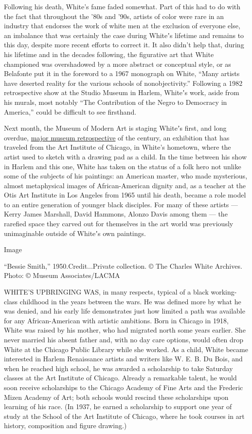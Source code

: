 Following his death, White's fame faded somewhat. Part of this had to do
with the fact that throughout the '80s and '90s, artists of color were
rare in an industry that endorses the work of white men at the exclusion
of everyone else, an imbalance that was certainly the case during
Whiteʼs lifetime and remains to this day, despite more recent efforts to
correct it. It also didn't help that, during his lifetime and in the
decades following, the figurative art that White championed was
overshadowed by a more abstract or conceptual style, or as Belafonte put
it in the foreword to a 1967 monograph on White, ``Many artists have
deserted reality for the various schools of nonobjectivity.'' Following
a 1982 retrospective show at the Studio Museum in Harlem, Whiteʼs work,
aside from his murals, most notably ``The Contribution of the Negro to
Democracy in America,'' could be difficult to see firsthand.

Next month, the Museum of Modern Art is staging Whiteʼs first, and long
overdue, \href{https://www.moma.org/calendar/exhibitions/3930}{major
museum retrospective} of the century, an exhibition that has traveled
from the Art Institute of Chicago, in White's hometown, where the artist
used to sketch with a drawing pad as a child. In the time between his
show in Harlem and this one, White has taken on the status of a folk
hero not unlike some of the subjects of his paintings: an American
master, who made mysterious, almost metaphysical images of
African-American dignity and, as a teacher at the Otis Art Institute in
Los Angeles from 1965 until his death, became a role model to an entire
generation of younger black disciples. For many of these artists ---
Kerry James Marshall, David Hammons, Alonzo Davis among them --- the
rarefied space they carved out for themselves in the art world was
previously unimaginable outside of Whiteʼs own paintings.

Image

``Bessie Smith,'' 1950.Credit...Private collection. © The Charles White
Archives. Photo: © Museum Associates/LACMA

WHITE'S UPBRINGING WAS, in many respects, typical of a black
working-class childhood in the years between the wars. He was defined
more by what he was denied, and his early life demonstrates just how
limited a path was available for any African-American with artistic
ambitions. Born in Chicago in 1918, White was raised by his mother, who
had migrated north some years earlier. She never married his absent
father and, with no day care options, would often drop White at the
Chicago Public Library while she worked. As a child, White became
interested in Harlem Renaissance artists and writers like W. E. B. Du
Bois, and when he reached high school, he was awarded a scholarship to
take Saturday classes at the Art Institute of Chicago. Already a
remarkable talent, he would soon receive scholarships to the Chicago
Academy of Fine Arts and the Frederic Mizen Academy of Art; both schools
would rescind these scholarships upon learning of his race. (In 1937, he
earned a scholarship to support one year of study at the School of the
Art Institute of Chicago, where he took courses in art history,
composition and figure drawing.)

